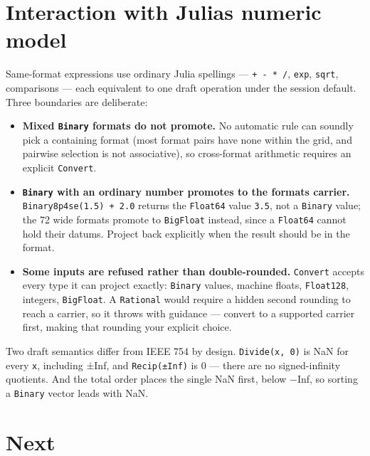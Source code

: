 \section{Interaction with Julia{\textquotesingle}s numeric model}



\label{12536725406993873247}{}


Same-format expressions use ordinary Julia spellings — \texttt{+ - * /}, \texttt{exp}, \texttt{sqrt}, comparisons — each equivalent to one draft operation under the session default. Three boundaries are deliberate:



\begin{itemize}
\item \textbf{Mixed \texttt{Binary} formats do not promote.} No automatic rule can soundly pick a containing format (most format pairs have none within the grid, and pairwise selection is not associative), so cross-format arithmetic requires an explicit \texttt{Convert}.


\item \textbf{\texttt{Binary} with an ordinary number promotes to the format{\textquotesingle}s carrier.} \texttt{Binary8p4se(1.5) + 2.0} returns the \texttt{Float64} value \texttt{3.5}, not a \texttt{Binary} value; the 72 wide formats promote to \texttt{BigFloat} instead, since a \texttt{Float64} cannot hold their datums. Project back explicitly when the result should be in the format.


\item \textbf{Some inputs are refused rather than double-rounded.} \texttt{Convert} accepts every type it can project exactly: \texttt{Binary} values, machine floats, \texttt{Float128}, integers, \texttt{BigFloat}. A \texttt{Rational} would require a hidden second rounding to reach a carrier, so it throws with guidance — convert to a supported carrier first, making that rounding your explicit choice.

\end{itemize}


Two draft semantics differ from IEEE 754 by design. \texttt{Divide(x, 0)} is NaN for every \texttt{x}, including ±Inf, and \texttt{Recip(±Inf)} is 0 — there are no signed-infinity quotients. And the total order places the single NaN first, below −Inf, so sorting a \texttt{Binary} vector leads with NaN.



\section{Next}



